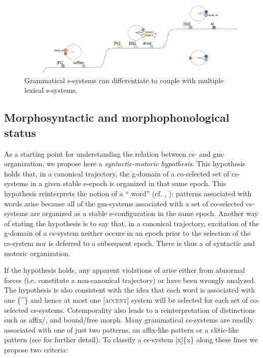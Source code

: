 \begin{enumerate}
  
\begin{figure}
\includegraphics[width=\textwidth]{figures/Tilsen-img67.png}
\caption{Grammatical s-systems can differentiate to couple with multiple lexical s-systems.}
\label{fig:4:17}
\end{figure}
\end{enumerate}
 

\subsection{Morphosyntactic and morphophonological status}

As a starting point for understanding the relation between cs- and gm-organization, we propose here a \textit{syntactic-motoric  hypothesis}. This hypothesis holds that, in a canonical trajectory, the g-domain of a co-selected set of cs-systems in a given stable e-epoch is organized in that same epoch. This hypothesis reinterprets the notion of a “ word” (cf. \citealt{NesporVogel1986}, \citealt{Selkirk1984,Selkirk2011}): patterns associated with  words arise because all of the gm-systems associated with a set of co-selected cs-systems are organized as a stable e-configuration in the same epoch. Another way of stating the hypothesis is to say that, in a canonical trajectory, excitation of the g-domain of a cs-system neither occurs in an epoch prior to the selection of the cs-system nor is deferred to a subsequent epoch. There is thus a  of syntactic and motoric organization. 

  If the  hypothesis holds, any apparent violations of  arise either from abnormal  forces (i.e. constitute a non-canonical trajectory) or have been wrongly analyzed. The hypothesis is also consistent with the idea that each  word is associated with one  \{\^{}\} and hence at most one [\textsc{accent}] system will be selected for each set of co-selected cs-systems. Cotemporality also leads to a reinterpretation of  distinctions such as affix/, and bound/free morph. Many grammatical cs-systems are readily associated with one of just two  patterns, an affix-like pattern or a clitic-like pattern (see \citealt{Payne1997,Zwicky1985,ZwickyPullum1983} for further detail). To classify a cs-system [x]\{x\} along these lines we propose two criteria:\\

